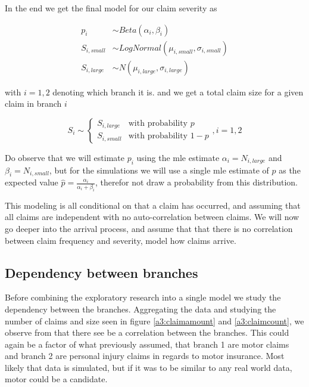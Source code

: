 \documentclass[11pt]{article}
\begin{document}
In the end we get the final model for our claim severity as

\begin{equation}
    \begin{split}
        p_{i} &\sim Beta(\alpha_i,\beta_i)  \\
        S_{i,small} &\sim LogNormal(\mu_{i,small},\sigma_{i,small}) \\
        S_{i,large} &\sim N(\mu_{i,large},\sigma_{i,large})
    \end{split}
\end{equation}

with $i=1,2$ denoting which branch it is.
and we get a total claim size for a given claim in branch $i$

\begin{equation*}
    S_i \sim \begin{cases}
      S_{i,large}  & \text{with probability } p\\
      S_{i,small}  & \text{with probability } 1-p
    \end{cases},  i =1,2
    \label{a2:formula}
\end{equation*}


Do observe that we will estimate $p_i$ using the mle estimate $\alpha_i= N_{i,large}$ and $\beta_i=N_{i,small}$, but for the simulations we will use a single mle estimate of $p$ as the expected value $\hat{p}=\frac{\alpha_i}{\alpha_i+\beta_i}$, therefor not draw a probability from this distribution.

This modeling is all conditional on that a claim has occurred, and assuming that all claims are independent with no auto-correlation between claims.
We will now go deeper into the arrival process, and assume that that there is no correlation between claim frequency and severity, model how claims arrive.

\subsection*{Dependency between branches}
Before combining the exploratory research into a single model we study the dependency between the branches.
Aggregating the data and studying the number of claims and size seen in figure \ref{a3:claimamount} and \ref{a3:claimcount}, we observe from that there see be a correlation between the branches.
This could again be a factor of what previously assumed, that branch 1 are motor claims and branch 2 are personal injury claims in regards to motor insurance.
Most likely that data is simulated, but if it was to be similar to any real world data, motor could be a candidate.
\end{document}
